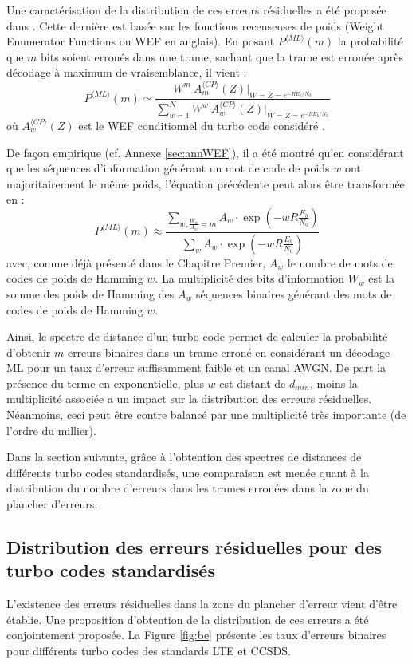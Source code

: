 Une caractérisation de la distribution de ces erreurs 
résiduelles a été proposée dans \cite{residual_errors}. Cette dernière est basée sur les fonctions recenseuses de poids
(Weight Enumerator Functions ou WEF en anglais). En posant $P^{\langle ML\rangle}(m)$ la probabilité que $m$ bits soient 
erronés dans une trame, sachant que la trame est erronée après décodage à maximum de vraisemblance, il vient :
\[P^{\langle ML\rangle}(m) \simeq \frac{W^m~A_m^{\langle CP\rangle}(Z)\vert_{W=Z=e^{-RE_b/N_0}}}{\sum\limits_{w=1}^N W^w~A_w^{\langle CP\rangle}(Z) \vert_{W=Z=e^{-RE_b/N_0}}}\]
où $A_w^{\langle CP\rangle}(Z)$ est le WEF conditionnel du turbo code considéré \cite{benedetto_unveiling}.

De façon empirique (cf. Annexe \ref{sec:annWEF}), il a été montré qu'en considérant que les séquences d'information 
générant un mot de code de poids $w$ ont majoritairement le même poids, l'équation précédente peut alors être transformée en : 
\begin{equation}
P^{\langle ML\rangle}(m) \approx \frac{\displaystyle\sum\limits_{w, \frac{W_w}{A_w}=m} A_w\cdot \exp\left(-w R \frac{E_b}{N_0}\right)}
                  {\displaystyle\sum\limits_{w} A_w\cdot \exp\left(-w R \frac{E_b}{N_0}\right)}
\label{eq:be}
\end{equation}
avec, comme déjà présenté dans le Chapitre Premier, $A_w$ le nombre de mots de codes de poids de Hamming $w$. La 
multiplicité des bits d'information $W_w$ est la somme des poids de Hamming des $A_w$ séquences binaires générant des
mots de codes de poids de Hamming $w$. 

Ainsi, le spectre de distance d'un turbo code permet de calculer la probabilité 
d'obtenir $m$ erreurs binaires dans un trame erroné en considérant un décodage ML pour un taux d'erreur suffisamment 
faible et un canal AWGN. De part la présence du terme en exponentielle, plus $w$ est distant de $d_{min}$, moins la 
multiplicité associée a un impact sur la distribution des erreurs résiduelles. Néanmoins, ceci peut être contre balancé 
par une multiplicité très importante (de l'ordre du millier).

Dans la section suivante, grâce à l'obtention des spectres de distances de différents turbo codes standardisés, une 
comparaison est menée quant à la distribution du nombre d'erreurs dans les trames erronées dans la zone du plancher d'erreurs.


\subsection{Distribution des erreurs résiduelles pour des turbo codes standardisés}
L'existence des erreurs résiduelles dans la zone du plancher d'erreur vient d'être établie. Une proposition d'obtention 
de la distribution de ces erreurs a été conjointement proposée. La Figure \ref{fig:be} présente les taux d'erreurs binaires pour 
différents turbo codes des standards LTE et CCSDS.


